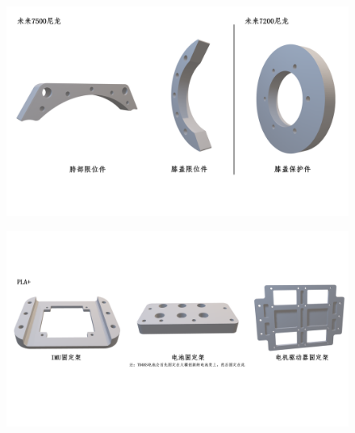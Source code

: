 \begin{figure}
  \centering
  \includegraphics[width=1.4\linewidth, angle=90]{figures/appendix/3d2.png}
   \vspace{6pt}
\end{figure}

\begin{figure}
  \centering
  \includegraphics[width=1.4\linewidth, angle=90]{figures/appendix/3d3.png}
   \vspace{6pt}
\end{figure}

\clearpage







